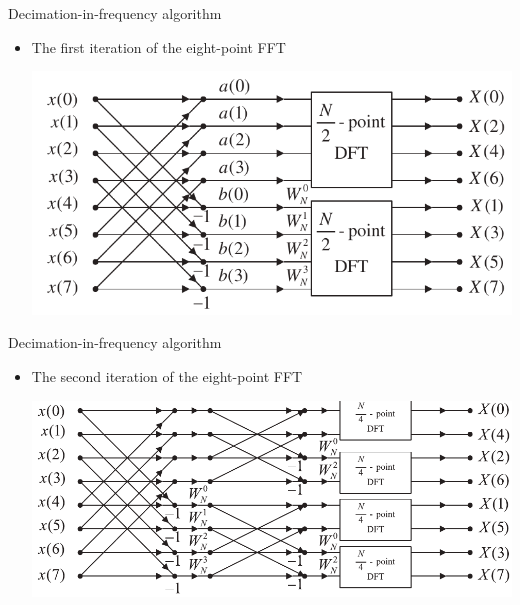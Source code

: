 \documentclass[pdflatex,compress,mathserif]{beamer}
\begin{document}
\begin{frame}{Decimation-in-frequency algorithm}
	\begin{itemize}
		\item The first iteration of the eight-point FFT
		\begin{center}
			\includegraphics[width=\linewidth]{img/img15}
		\end{center}
	\end{itemize}
\end{frame}

\begin{frame}{Decimation-in-frequency algorithm}
	\begin{itemize}
		\item The second iteration of the eight-point FFT
		\begin{center}
			\includegraphics[width=\linewidth]{img/img16}
		\end{center}
	\end{itemize}
\end{frame}
\end{document}
